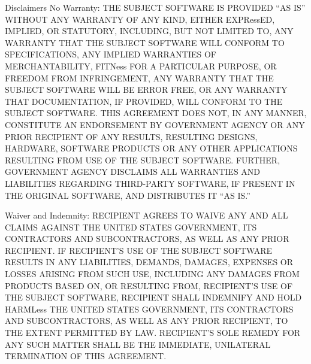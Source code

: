 \documentclass[letterpaper,10pt,english]{sphinxmanual}
\begin{document}
Disclaimers
No Warranty: THE SUBJECT SOFTWARE IS PROVIDED “AS IS” WITHOUT ANY WARRANTY OF
ANY KIND, EITHER EXPRessED, IMPLIED, OR STATUTORY, INCLUDING, BUT NOT LIMITED
TO, ANY WARRANTY THAT THE SUBJECT SOFTWARE WILL CONFORM TO SPECIFICATIONS, ANY
IMPLIED WARRANTIES OF MERCHANTABILITY, FITNess FOR A PARTICULAR PURPOSE, OR
FREEDOM FROM INFRINGEMENT, ANY WARRANTY THAT THE SUBJECT SOFTWARE WILL BE ERROR
FREE, OR ANY WARRANTY THAT DOCUMENTATION, IF PROVIDED, WILL CONFORM TO THE
SUBJECT SOFTWARE. THIS AGREEMENT DOES NOT, IN ANY MANNER, CONSTITUTE AN
ENDORSEMENT BY GOVERNMENT AGENCY OR ANY PRIOR RECIPIENT OF ANY RESULTS,
RESULTING DESIGNS, HARDWARE, SOFTWARE PRODUCTS OR ANY OTHER APPLICATIONS
RESULTING FROM USE OF THE SUBJECT SOFTWARE.  FURTHER, GOVERNMENT AGENCY
DISCLAIMS ALL WARRANTIES AND LIABILITIES REGARDING THIRD-PARTY SOFTWARE, IF
PRESENT IN THE ORIGINAL SOFTWARE, AND DISTRIBUTES IT “AS IS.”

Waiver and Indemnity:  RECIPIENT AGREES TO WAIVE ANY AND ALL CLAIMS AGAINST THE
UNITED STATES GOVERNMENT, ITS CONTRACTORS AND SUBCONTRACTORS, AS WELL AS ANY
PRIOR RECIPIENT.  IF RECIPIENT’S USE OF THE SUBJECT SOFTWARE RESULTS IN ANY
LIABILITIES, DEMANDS, DAMAGES, EXPENSES OR LOSSES ARISING FROM SUCH USE,
INCLUDING ANY DAMAGES FROM PRODUCTS BASED ON, OR RESULTING FROM, RECIPIENT’S
USE OF THE SUBJECT SOFTWARE, RECIPIENT SHALL INDEMNIFY AND HOLD HARMLess THE
UNITED STATES GOVERNMENT, ITS CONTRACTORS AND SUBCONTRACTORS, AS WELL AS ANY
PRIOR RECIPIENT, TO THE EXTENT PERMITTED BY LAW.  RECIPIENT’S SOLE REMEDY FOR
ANY SUCH MATTER SHALL BE THE IMMEDIATE, UNILATERAL TERMINATION OF THIS
AGREEMENT.
\end{document}
